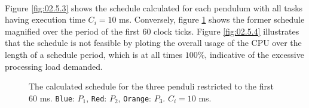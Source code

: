 \noindent{}\\


Figure \ref{fig:02.5.3} shows the schedule calculated for each pendulum with all
tasks having execution time $C_i = 10$ ms. Conversely, figure
\ref{fig:02.5.3.small} shows the former schedule magnified over the period of
the first 60 clock ticks. Figure \ref{fig:02.5.4} illustrates that the schedule
is not feasible by ploting the overall usage of the CPU over the length of a
schedule period, which is at all times $100\%$, indicative of the excessive
processing load demanded.

\begin{figure}[H]\centering
  \scalebox{1}{}
  \caption{The calculated schedule for the three penduli restricted to the first
    60 ms. \texttt{Blue}: $P_1$, \texttt{Red}: $P_2$,
    \texttt{Orange}: $P_3$. $C_i = 10$ ms.}
\label{fig:02.5.3.small}
\end{figure}


